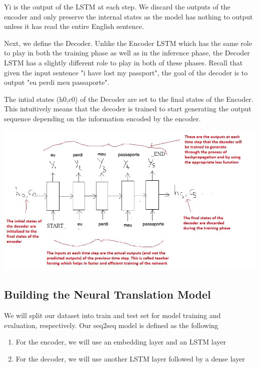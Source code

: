 \documentclass{llncs}
\begin{document}
 	Y{i} is the output of the LSTM at each step. We discard the outputs of the encoder and only preserve the internal states as the model has nothing to output unless it has read the entire English sentence.
	
	Next, we define the Decoder. Unlike the Encoder LSTM which has the same role to play in both the training phase as well as in the inference phase, the Decoder LSTM has a slightly different role to play in both of these phases. Recall that given the input sentence "i have lost my passport", the goal of the decoder is to output "eu perdi meu passaporte". 

	The intial states (h{0},c{0}) of the Decoder are set to the final states of the Encoder. This intuitively means that the decoder is trained to start generating the output sequence depending on the information encoded by the encoder.
	
	\begin{minipage}{\linewidth}
	 	\begin{center}
	 		\includegraphics[width=\linewidth]{decoder.jpeg}\cite{Anu:2013}
	 		\label{fig:Decoder LSTM}
	 	\end{center}
	 \end{minipage}
	 \afterpage{\clearpage}
	 
	\subsection{Building the Neural Translation Model}
	We will split our dataset into train and test set for model training and evaluation, respectively.
	Our seq2seq model is defined as the following

	\begin{enumerate}
		\item For the encoder, we will use an embedding layer and an LSTM layer
		\item For the decoder, we will use another LSTM layer followed by a dense layer
	\end{enumerate}
\end{document}

